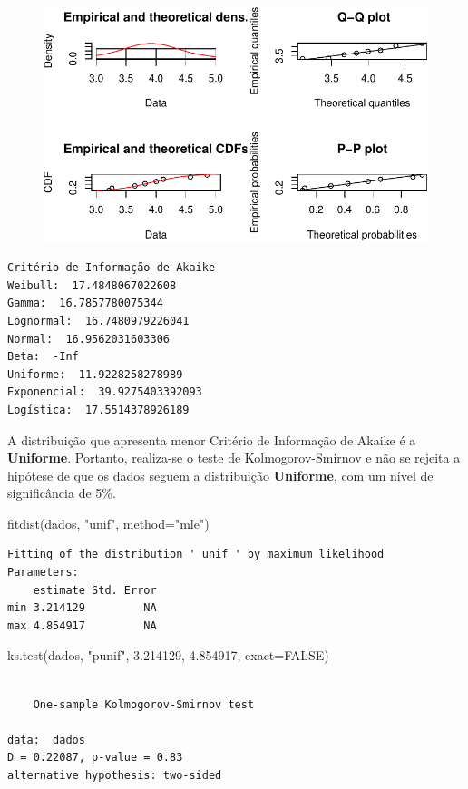 \documentclass[
  letterpaper,
  DIV=11,
  numbers=noendperiod]{scrartcl}
\newenvironment{Shaded}{\begin{snugshade}}{\end{snugshade}}
\newcommand{\AttributeTok}[1]{\textcolor[rgb]{0.40,0.45,0.13}{#1}}
\newcommand{\ConstantTok}[1]{\textcolor[rgb]{0.56,0.35,0.01}{#1}}
\newcommand{\FloatTok}[1]{\textcolor[rgb]{0.68,0.00,0.00}{#1}}
\newcommand{\FunctionTok}[1]{\textcolor[rgb]{0.28,0.35,0.67}{#1}}
\newcommand{\NormalTok}[1]{\textcolor[rgb]{0.00,0.23,0.31}{#1}}
\newcommand{\StringTok}[1]{\textcolor[rgb]{0.13,0.47,0.30}{#1}}
\begin{document}
\begin{figure}[H]

{\centering \includegraphics{quiz5_files/figure-pdf/unnamed-chunk-39-9.pdf}

}

\end{figure}

\begin{verbatim}
Critério de Informação de Akaike
Weibull:  17.4848067022608 
Gamma:  16.7857780075344 
Lognormal:  16.7480979226041 
Normal:  16.9562031603306 
Beta:  -Inf 
Uniforme:  11.9228258278989 
Exponencial:  39.9275403392093 
Logística:  17.5514378926189 
\end{verbatim}

A distribuição que apresenta menor Critério de Informação de Akaike é a
\textbf{Uniforme}. Portanto, realiza-se o teste de Kolmogorov-Smirnov e
não se rejeita a hipótese de que os dados seguem a distribuição
\textbf{Uniforme}, com um nível de significância de 5\%.

\begin{Shaded}
\begin{Highlighting}[]
\FunctionTok{fitdist}\NormalTok{(dados, }\StringTok{"unif"}\NormalTok{, }\AttributeTok{method=}\StringTok{"mle"}\NormalTok{)}
\end{Highlighting}
\end{Shaded}

\begin{verbatim}
Fitting of the distribution ' unif ' by maximum likelihood 
Parameters:
    estimate Std. Error
min 3.214129         NA
max 4.854917         NA
\end{verbatim}

\begin{Shaded}
\begin{Highlighting}[]
\FunctionTok{ks.test}\NormalTok{(dados, }\StringTok{"punif"}\NormalTok{, }\FloatTok{3.214129}\NormalTok{, }\FloatTok{4.854917}\NormalTok{, }\AttributeTok{exact=}\ConstantTok{FALSE}\NormalTok{)}
\end{Highlighting}
\end{Shaded}

\begin{verbatim}

    One-sample Kolmogorov-Smirnov test

data:  dados
D = 0.22087, p-value = 0.83
alternative hypothesis: two-sided
\end{verbatim}
\end{document}
